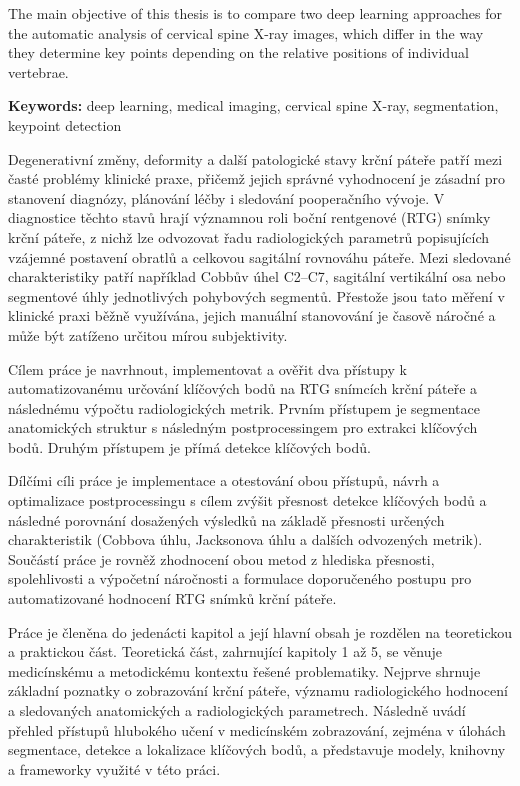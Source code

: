 \documentclass[male,czech,api_bc]{kitheses}
\begin{document}
The main objective of this thesis is to compare two deep learning approaches for the automatic analysis of cervical spine X-ray images, which differ in the way they determine key points depending on the relative positions of individual vertebrae.

\textbf{Keywords:} deep learning, medical imaging, cervical spine X-ray, segmentation, keypoint detection

\tableofcontents


Degenerativní změny, deformity a další patologické stavy krční páteře patří mezi časté problémy klinické praxe, přičemž jejich správné vyhodnocení je zásadní pro stanovení diagnózy, plánování léčby i sledování pooperačního vývoje. V diagnostice těchto stavů hrají významnou roli boční rentgenové (RTG) snímky krční páteře, z nichž lze odvozovat řadu radiologických parametrů popisujících vzájemné postavení obratlů a celkovou sagitální rovnováhu páteře. Mezi sledované charakteristiky patří například Cobbův úhel C2--C7, sagitální vertikální osa nebo segmentové úhly jednotlivých pohybových segmentů. Přestože jsou tato měření v klinické praxi běžně využívána, jejich manuální stanovování je časově náročné a může být zatíženo určitou mírou subjektivity.

Cílem práce je navrhnout, implementovat a ověřit dva přístupy k automatizovanému určování klíčových bodů na RTG snímcích krční páteře a následnému výpočtu radiologických metrik. Prvním přístupem je segmentace anatomických struktur s následným postprocessingem pro extrakci klíčových bodů. Druhým přístupem je přímá detekce klíčových bodů.

Dílčími cíli práce je implementace a otestování obou přístupů, návrh a optimalizace postprocessingu s cílem zvýšit přesnost detekce klíčových bodů a následné porovnání dosažených výsledků na základě přesnosti určených charakteristik (Cobbova úhlu, Jacksonova úhlu a dalších odvozených metrik). Součástí práce je rovněž zhodnocení obou metod z hlediska přesnosti, spolehlivosti a výpočetní náročnosti a formulace doporučeného postupu pro automatizované hodnocení RTG snímků krční páteře.

Práce je členěna do jedenácti kapitol a její hlavní obsah je rozdělen na teoretickou a praktickou část. Teoretická část, zahrnující kapitoly 1 až 5, se věnuje medicínskému a metodickému kontextu řešené problematiky. Nejprve shrnuje základní poznatky o zobrazování krční páteře, významu radiologického hodnocení a sledovaných anatomických a radiologických parametrech. Následně uvádí přehled přístupů hlubokého učení v medicínském zobrazování, zejména v úlohách segmentace, detekce a lokalizace klíčových bodů, a představuje modely, knihovny a frameworky využité v této práci.
\end{document}
